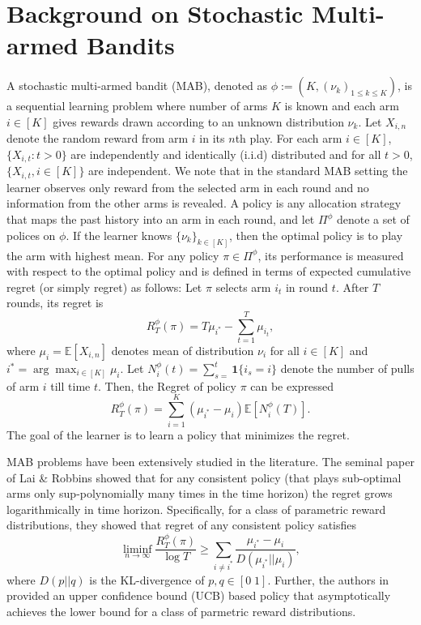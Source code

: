\documentclass{article}
\begin{document}
\section{Background on Stochastic Multi-armed Bandits}
A stochastic multi-armed bandit (MAB), denoted as $\phi:=(K, (\nu_k)_{1 \leq k \leq K})$, is a sequential learning problem where number of arms $K$ is known and each arm $i \in [K]$ gives rewards drawn according to an unknown distribution $\nu_k$. Let $X_{i,n}$ denote the random reward from arm $i$ in its $n$th play. For each arm $i\in [K]$, $\{X_{i,t}: t>0\}$ are independently and identically (i.i.d) distributed and for all $t>0$, $\{X_{i,t}, i \in [K]\}$ are independent. We note that in the standard MAB setting the learner observes only reward from the selected arm in each round and no information from the other arms is revealed. A policy is any allocation strategy that maps the past history into an arm in each round, and let $\Pi^\phi$ denote a set of polices on $\phi$. If the learner knows $\{\nu_k\}_{k \in [K]}$, then the optimal policy is to play the arm with highest mean. For any policy $\pi \in \Pi^\phi$, its performance is measured with respect to the optimal policy and is defined in terms of expected cumulative regret (or simply regret) as follows:  Let $\pi$ selects arm $i_t$ in round $t$. After $T$ rounds, its regret is 
\begin{equation}
\label{eqn:BanditRegret}
R^\phi_T(\pi)= T \mu_{i^*}- \sum_{t=1}^{T}\mu_{i_t},
\end{equation} 
where $\mu_i=\mathbb{E}[X_{i,n}]$ denotes mean of distribution  $\nu_i$ for all $i\in [K]$ and  $i^*= \arg\max_{i \in [K]} \mu_i$. Let $N^\phi_i(t)=\sum_{s=}^{t}\boldsymbol{1}\{i_s=i\}$ denote the number of pulls of arm $i$ till time $t$. Then, the Regret of policy $\pi$ can be expressed 
\[R^\phi_T(\pi)=\sum_{i=1}^{K}(\mu_{i^*}-\mu_i)\mathbb{E}[N^\phi_i(T)].\]
The goal of the learner is to learn a policy that minimizes the regret.  

MAB problems have been extensively studied in the literature. The seminal paper of Lai \& Robbins 
\cite{AAM85_Asymptotically_LaiRobbins} showed that for any consistent policy (that plays sub-optimal arms only sup-polynomially many times in the time horizon) the regret grows logarithmically in time horizon. Specifically, for a class of parametric reward distributions, they showed that regret of any consistent policy satisfies
\begin{equation}
\label{eqn:MABLowerBound}
\liminf_{n \rightarrow \infty}\frac{ R^\phi_T(\pi)}{\log T} \geq \sum_{i\neq i^*} \frac{\mu_{i^*}-\mu_i}{D(\mu_{i^*}||\mu_i)},
\end{equation}
where  $D(p||q)$ is the KL-divergence of $p,q \in [0\; 1]$. Further, the authors in \cite{AAM85_Asymptotically_LaiRobbins}  provided an upper confidence bound (UCB) based policy that asymptotically achieves the lower bound for a class of parmetric reward distributions.
 
\end{document}
